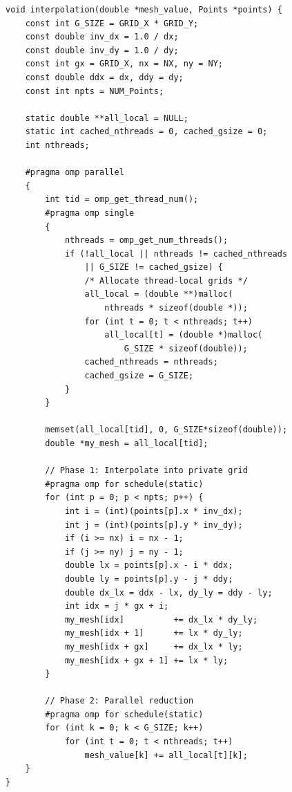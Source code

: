 \documentclass[12pt,a4paper]{article}
\begin{document}
\begin{lstlisting}[caption={Optimized parallel interpolation (utils.cpp)}, label={lst:interpolation}]
void interpolation(double *mesh_value, Points *points) {
    const int G_SIZE = GRID_X * GRID_Y;
    const double inv_dx = 1.0 / dx;
    const double inv_dy = 1.0 / dy;
    const int gx = GRID_X, nx = NX, ny = NY;
    const double ddx = dx, ddy = dy;
    const int npts = NUM_Points;

    static double **all_local = NULL;
    static int cached_nthreads = 0, cached_gsize = 0;
    int nthreads;

    #pragma omp parallel
    {
        int tid = omp_get_thread_num();
        #pragma omp single
        {
            nthreads = omp_get_num_threads();
            if (!all_local || nthreads != cached_nthreads
                || G_SIZE != cached_gsize) {
                /* Allocate thread-local grids */
                all_local = (double **)malloc(
                    nthreads * sizeof(double *));
                for (int t = 0; t < nthreads; t++)
                    all_local[t] = (double *)malloc(
                        G_SIZE * sizeof(double));
                cached_nthreads = nthreads;
                cached_gsize = G_SIZE;
            }
        }

        memset(all_local[tid], 0, G_SIZE*sizeof(double));
        double *my_mesh = all_local[tid];

        // Phase 1: Interpolate into private grid
        #pragma omp for schedule(static)
        for (int p = 0; p < npts; p++) {
            int i = (int)(points[p].x * inv_dx);
            int j = (int)(points[p].y * inv_dy);
            if (i >= nx) i = nx - 1;
            if (j >= ny) j = ny - 1;
            double lx = points[p].x - i * ddx;
            double ly = points[p].y - j * ddy;
            double dx_lx = ddx - lx, dy_ly = ddy - ly;
            int idx = j * gx + i;
            my_mesh[idx]          += dx_lx * dy_ly;
            my_mesh[idx + 1]      += lx * dy_ly;
            my_mesh[idx + gx]     += dx_lx * ly;
            my_mesh[idx + gx + 1] += lx * ly;
        }

        // Phase 2: Parallel reduction
        #pragma omp for schedule(static)
        for (int k = 0; k < G_SIZE; k++)
            for (int t = 0; t < nthreads; t++)
                mesh_value[k] += all_local[t][k];
    }
}
\end{lstlisting}

\end{document}

